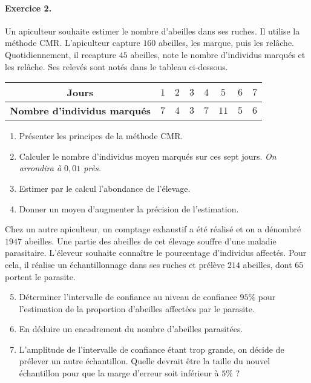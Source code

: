 \documentclass[11pt]{article}
\begin{document}
\paragraph{Exercice 2.} Un apiculteur souhaite estimer le nombre d'abeilles dans
ses ruches. Il utilise la méthode CMR. L'apiculteur capture $160$ abeilles, les
marque, puis les rel\^ache. Quotidiennement, il recapture $45$ abeilles, note le
nombre d'individus marqués et les rel\^ache. Ses relevés sont notés dans le
tableau ci-dessous.
\begin{center}
  \renewcommand{\arraystretch}{1.2}
  \begin{tabular}[]{|c|c|c|c|c|c|c|c|}
    \hline
    \textbf{Jours} & $1$ & $2$ & $3$ & $4$ & $5$ & $6$ & $7$ \\
    \hline
    \textbf{Nombre d'individus marqués} & $7$ & $4$ & $3$ & $7$ & $11$ & $5$ &
    $6$ \\
    \hline
  \end{tabular}
\end{center}
\begin{enumerate}
  \item Présenter les principes de la méthode CMR.
  \item Calculer le nombre d'individus moyen marqués sur ces sept jours.
    \emph{On arrondira à $0,01$ près.}
  \item Estimer par le calcul l'abondance de l'élevage.
  \item Donner un moyen d'augmenter la précision de l'estimation.
\end{enumerate}
Chez un autre apiculteur, un comptage exhaustif a été réalisé et on a dénombré
$1947$ abeilles. Une partie des abeilles de cet élevage souffre d'une maladie
parasitaire. L'éleveur souhaite connaître le pourcentage d'individus affectés.
Pour cela, il réalise un échantillonnage dans ses ruches et prélève $214$
abeilles, dont $65$ portent le parasite.
\begin{enumerate}
    \setcounter{enumi}{4}
  \item Déterminer l'intervalle de confiance au niveau de confiance $95$\% pour
    l'estimation de la proportion d'abeilles affectées par le parasite.
  \item En déduire un encadrement du nombre d'abeilles parasitées.
  \item L'amplitude de l'intervalle de confiance étant trop grande, on décide de prélever un
    autre échantillon. Quelle devrait être la taille du nouvel échantillon pour
    que la marge d'erreur soit inférieur à $5$\% ?
\end{enumerate}
\end{document}
